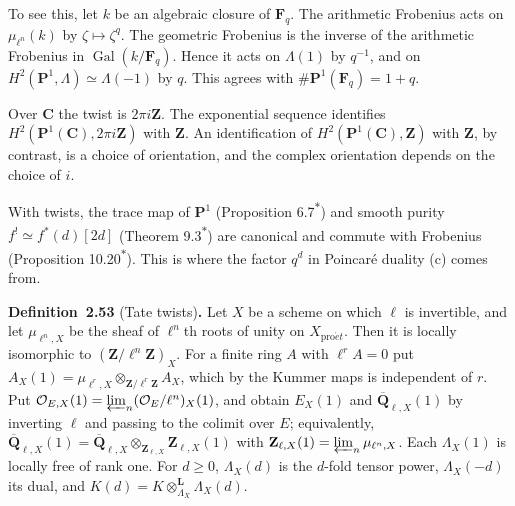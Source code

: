 \documentclass[11pt]{article}
\newenvironment{bpstatement}[2]{\par\addvspace{0.6\baselineskip}\noindent\textbf{#1}#2\textbf{.}\enspace\ignorespaces}
  {\par\addvspace{0.4\baselineskip}}
\newcommand{\bpout}[1]{#1\textsuperscript{\hyperlink{bp-outside}{\ensuremath{\ast}}}}
\providecommand{\QbarX}{}\renewcommand{\QbarX}{\overline{\mathbf Q}_{\ell,X}}
\begin{document}
To see this, let \(k\) be an algebraic closure of \(\mathbf F_q\). The arithmetic Frobenius acts on \(\mu_{\ell^n}(k)\) by \(\zeta\mapsto\zeta^q\). The geometric Frobenius is the inverse of the arithmetic Frobenius in \(\operatorname{Gal}(k/\mathbf F_q)\). Hence it acts on \(\Lambda(1)\) by \(q^{-1}\), and on \(H^2(\mathbf P^1,\Lambda)\simeq\Lambda(-1)\) by \(q\). This agrees with \(\#\mathbf P^1(\mathbf F_q)=1+q\).

Over \(\mathbf C\) the twist is \(2\pi i\mathbf Z\). The exponential sequence identifies \(H^2(\mathbf P^1(\mathbf C),2\pi i\mathbf Z)\) with \(\mathbf Z\). An identification of \(H^2(\mathbf P^1(\mathbf C),\mathbf Z)\) with \(\mathbf Z\), by contrast, is a choice of orientation, and the complex orientation depends on the choice of \(i\).

With twists, the trace map of \(\mathbf P^1\) (Proposition \bpout{6.7}) and smooth purity \(f^!\simeq f^*(d)[2d]\) (Theorem \bpout{9.3}) are canonical and commute with Frobenius (Proposition \bpout{10.20}). This is where the factor \(q^d\) in Poincaré duality (c) comes from.

\label{bp162}%
\begin{bpstatement}{Definition~2.53}{ (Tate twists)}
Let \(X\) be a scheme on which \(\ell\) is invertible, and let \(\mu_{\ell^n,X}\) be the sheaf of \(\ell^n\)th roots of unity on \(X_{\mathrm{pro}\acute{e}t}\). Then it is locally isomorphic to \((\mathbf Z/\ell^n\mathbf Z)_X\). For a finite ring \(A\) with \(\ell^rA=0\) put \(A_X(1)=\mu_{\ell^r,X}\otimes_{\mathbf Z/\ell^r\mathbf Z}A_X\), which by the Kummer maps is independent of \(r\). Put \(\mathcal O_{E,X}(1)=\varprojlim_n(\mathcal O_E/\ell^n)_X(1)\), and obtain \(E_X(1)\) and \(\QbarX(1)\) by inverting \(\ell\) and passing to the colimit over \(E\); equivalently, \(\QbarX(1)=\QbarX\otimes_{\mathbf Z_{\ell,X}}\mathbf Z_{\ell,X}(1)\) with \(\mathbf Z_{\ell,X}(1)=\varprojlim_n\mu_{\ell^n,X}\). Each \(\Lambda_X(1)\) is locally free of rank one. For \(d\ge0\), \(\Lambda_X(d)\) is the \(d\)-fold tensor power, \(\Lambda_X(-d)\) its dual, and \(K(d)=K\otimes^{\mathbf L}_{\Lambda_X}\Lambda_X(d)\).
\end{bpstatement}


\end{document}
